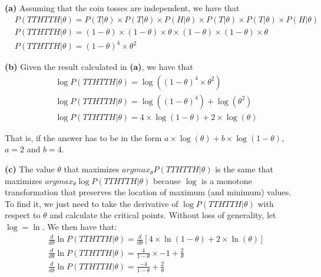 \documentclass[leqno]{article}
\begin{document}
\noindent \textbf{(a)} Assuming that the coin tosses are independent, %
we have that
\begin{equation*}
\begin{split}
&P(TTHTTH|\theta) = P(T|\theta) \times P(T|\theta) \times P(H|\theta) \times P(T|\theta) \times P(T|\theta) \times P(H|\theta)
\\
&P(TTHTTH|\theta) = (1 - \theta) \times (1 - \theta) \times \theta \times (1 - \theta) \times (1 - \theta) \times \theta
\\
&P(TTHTTH|\theta) = (1 - \theta)^4 \times \theta^2
\end{split}  
\end{equation*}

\hfill

\noindent \textbf{(b)} Given the result calculated in \textbf{(a)}, we have that
\begin{equation*}
\begin{split}
&\log P(TTHTTH|\theta) = \log ((1 - \theta)^4 \times \theta^2)
\\
&\log P(TTHTTH|\theta) = \log ((1 - \theta)^4) + \log (\theta^2)
\\
&\log P(TTHTTH|\theta) = 4 \times \log (1 - \theta) + 2 \times \log (\theta)
\end{split}  
\end{equation*}

\noindent That is, if the answer has to be in the form $a \times \log (\theta) + b \times \log (1 - \theta)$, $a = 2$ and $b = 4$.

\hfill 

\noindent \textbf{(c)} The value $\theta$ that maximizes $argmax_{\theta}P(TTHTTH|\theta)$ is the same that maximizes $argmax_{\theta}\log P(TTHTTH|\theta)$  
 because $\log$ is a monotone transformation that preserves the location of maximum (and minimum) values. To find it, we just need to take 
 the derivative of $\log P(TTHTTH|\theta)$ with respect to $\theta$ and calculate the critical points. Without loss of generality, let $\log = \ln$. We then have that:
\begin{equation*}
\begin{split}
&\frac{d}{d\theta}\ln P(TTHTTH|\theta) = \frac{d}{d\theta}[4 \times \ln (1 - \theta) + 2 \times \ln (\theta)]
\\
&\frac{d}{d\theta}\ln P(TTHTTH|\theta) = \frac{4}{1 - \theta} \times -1 + \frac{2}{\theta}
\\
&\frac{d}{d\theta}\ln P(TTHTTH|\theta) = \frac{-4}{1 - \theta} + \frac{2}{\theta}
\end{split}  
\end{equation*} 
\end{document}
